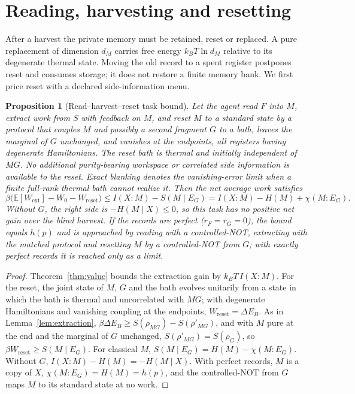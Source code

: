 \documentclass[12pt]{article}
\newtheorem{proposition}[theorem]{Proposition}
\begin{document}
\section{Reading, harvesting and resetting}
\label{sec:cycle}

After a harvest the private memory must be retained, reset or replaced. A pure replacement of dimension $d_M$ carries free energy $k_BT\ln d_M$ relative to its degenerate thermal state. Moving the old record to a spent register postpones reset and consumes storage; it does not restore a finite memory bank. We first price reset with a declared side-information menu.

\begin{proposition}[Read--harvest--reset task bound]
\label{prop:cycle}
Let the agent read $F$ into $M$, extract work from $S$ with feedback on $M$, and reset $M$ to a standard state by a protocol that couples $M$ and possibly a second fragment $G$ to a bath, leaves the marginal of $G$ unchanged, and vanishes at the endpoints, all registers having degenerate Hamiltonians. The reset bath is thermal and initially independent of $MG$. No additional purity-bearing workspace or correlated side information is available to the reset. Exact blanking denotes the vanishing-error limit when a finite full-rank thermal bath cannot realize it. Then the net average work satisfies
\[
\beta\bigl(\mathbb E[W_{\mathrm{ext}}]-W_0-W_{\mathrm{reset}}\bigr)\le I(X{:}M)-S(M\mid E_G)=I(X{:}M)-H(M)+\chi(M{:}E_G).
\]
Without $G$, the right side is $-H(M\mid X)\le0$, so this task has no positive net gain over the blind harvest. If the records are perfect ($r_F=r_G=0$), the bound equals $h(p)$ and is approached by reading with a controlled-NOT, extracting with the matched protocol and resetting $M$ by a controlled-NOT from $G$; with exactly perfect records it is reached only as a limit.
\end{proposition}

\begin{proof}
Theorem~\ref{thm:value} bounds the extraction gain by $k_BT\,I(X{:}M)$. For the reset, the joint state of $M$, $G$ and the bath evolves unitarily from a state in which the bath is thermal and uncorrelated with $MG$; with degenerate Hamiltonians and vanishing coupling at the endpoints, $W_{\mathrm{reset}}=\Delta E_B$. As in Lemma~\ref{lem:extraction}, $\beta\Delta E_B\ge S(\rho_{MG})-S(\rho'_{MG})$, and with $M$ pure at the end and the marginal of $G$ unchanged, $S(\rho'_{MG})=S(\rho_G)$, so $\beta W_{\mathrm{reset}}\ge S(M\mid E_G)$. For classical $M$, $S(M\mid E_G)=H(M)-\chi(M{:}E_G)$. Without $G$, $I(X{:}M)-H(M)=-H(M\mid X)$. With perfect records, $M$ is a copy of $X$, $\chi(M{:}E_G)=H(M)=h(p)$, and the controlled-NOT from $G$ maps $M$ to its standard state at no work.
\end{proof}
\end{document}
